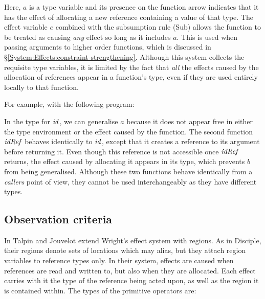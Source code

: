 
Here, $a$ is a type variable and its presence on the function arrow indicates that it has the effect of allocating a new reference containing a value of that type. The effect variable $e$ combined with the subsumption rule (Sub) allows the function to be treated as causing \emph{any} effect so long as it includes $a$. This is used when passing arguments to higher order functions, which is discussed in \S\ref{System:Effects:constraint-strengthening}. Although this system collects the requisite type variables, it is limited by the fact that \emph{all} the effects caused by the allocation of references appear in a function's type, even if they are used entirely locally to that function. 

For example, with the following program:


In the type for $\operatorname{\mathit{id}}$, we can generalise $a$ because it does not appear free in either the type environment or the effect caused by the function. The second function $\operatorname{\mathit{idRef}}$ behaves identically to $\operatorname{\mathit{id}}$, except that it creates a reference to its argument before returning it. Even though this reference is not accessible once $\operatorname{\mathit{idRef}}$ returns, the effect caused by allocating it appears in its type, which prevents $b$ from being generalised. Although these two functions behave identically from a \emph{callers} point of view, they cannot be used interchangeably as they have different types.



\subsection{Observation criteria}
\label{System:PolyUpdate:observation}
In \cite{talpin:discipline} Talpin and Jouvelot extend Wright's effect system with regions. As in Disciple, their regions denote sets of locations which may alias, but they attach region variables to reference types only. In their system, effects are caused when references are read and written to, but also when they are allocated. Each effect carries with it the type of the reference being acted upon, as well as the region it is contained within. The types of the primitive operators are:

